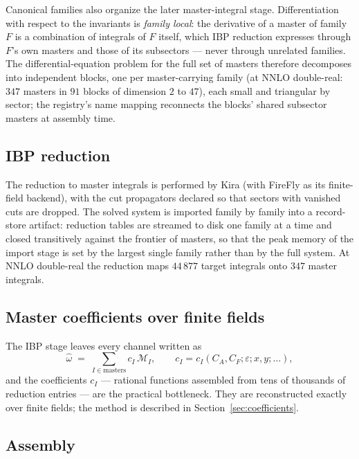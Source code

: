 \documentclass[11pt]{article}
\newcommand{\eps}{\varepsilon}
\newcommand{\CA}{C_A}
\newcommand{\CF}{C_F}
\begin{document}
Canonical families also organize the later master-integral stage.
Differentiation with respect to the invariants is \emph{family
local}: the derivative of a master of family $F$ is a combination of
integrals of $F$ itself, which IBP reduction expresses through $F$'s
own masters and those of its subsectors --- never through unrelated
families.  The differential-equation problem for the full set of
masters therefore decomposes into independent blocks, one per
master-carrying family (at NNLO double-real: $347$ masters in $91$
blocks of dimension $2$ to $47$), each small and triangular by
sector; the registry's name mapping reconnects the blocks' shared
subsector masters at assembly time.

\subsection{IBP reduction}

The reduction to master integrals is performed by \textsf{Kira} (with
\textsf{FireFly} as its finite-field backend), with the cut
propagators declared so that sectors with vanished cuts are dropped.
The solved system is imported family by family into a record-store
artifact: reduction tables are streamed to disk one family at a time
and closed transitively against the frontier of masters, so that the
peak memory of the import stage is set by the largest single family
rather than by the full system.  At NNLO double-real the reduction
maps $44\,877$ target integrals onto $347$ master integrals.

\subsection{Master coefficients over finite fields}

The IBP stage leaves every channel written as
\begin{equation}
  \hat\omega \;=\; \sum_{I \in \text{masters}} c_I \, \mathcal{M}_I ,
  \qquad
  c_I = c_I(\CA,\CF;\eps;x,y;\ldots),
\end{equation}
and the coefficients $c_I$ --- rational functions assembled from tens
of thousands of reduction entries --- are the practical bottleneck.
They are reconstructed exactly over finite fields; the method is
described in Section~\ref{sec:coefficients}.

\subsection{Assembly}
\end{document}
